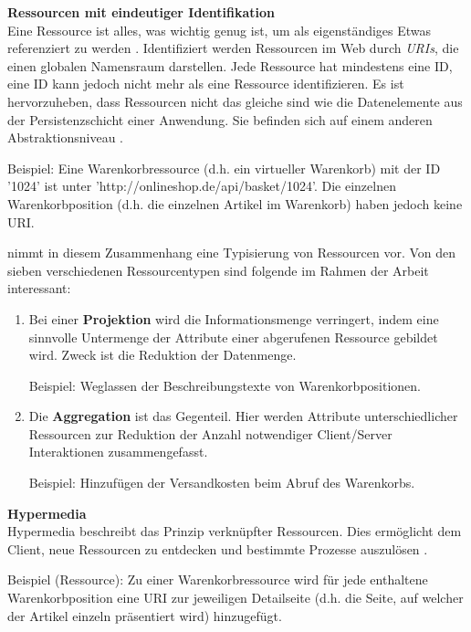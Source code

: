 \documentclass[11pt, a4paper, titlepage, listof=totoc, bibliography=totoc, index=totoc, twoside, openright, headings=normal, draft]{scrreprt}
\begin{document}
\textbf{Ressourcen mit eindeutiger Identifikation}\\
\glqq Eine Ressource ist alles, was wichtig genug ist, um als eigenständiges Etwas referenziert zu werden\grqq{} \citep{richardson07}. Identifiziert werden Ressourcen im Web durch \emph{\ac{URI}s}, die einen globalen Namensraum darstellen. Jede Ressource hat mindestens eine ID, eine ID kann jedoch nicht mehr als eine Ressource identifizieren. Es ist hervorzuheben, dass Ressourcen nicht das gleiche sind wie die Datenelemente aus der Persistenzschicht einer Anwendung. Sie befinden sich auf einem anderen Abstraktionsniveau \citep{tilkov11}.\vspace{0.3em}

Beispiel: Eine Warenkorbressource (d.h. ein virtueller Warenkorb) mit der ID '1024' ist unter 'http://onlineshop.de/api/basket/1024'. Die einzelnen Warenkorbposition (d.h. die einzelnen Artikel im Warenkorb) haben jedoch keine URI.

\citet{tilkov11} nimmt in diesem Zusammenhang eine Typisierung von Ressourcen vor. Von den sieben verschiedenen Ressourcentypen sind folgende im Rahmen der Arbeit interessant:
\begin{enumerate}
\item Bei einer \textbf{Projektion} wird die Informationsmenge verringert, indem eine sinnvolle Untermenge der Attribute einer abgerufenen Ressource gebildet wird. Zweck ist die Reduktion der Datenmenge.\vspace{0.2em}

Beispiel: Weglassen der Beschreibungstexte von Warenkorbpositionen.
\item Die \textbf{Aggregation} ist das Gegenteil. Hier werden Attribute unterschiedlicher Ressourcen zur Reduktion der Anzahl notwendiger Client/Server Interaktionen zusammengefasst.\vspace{0.2em}

Beispiel: Hinzufügen der Versandkosten beim Abruf des Warenkorbs.
\end{enumerate}
\textbf{Hypermedia}\\
Hypermedia beschreibt das Prinzip verknüpfter Ressourcen. Dies ermöglicht dem Client, neue Ressourcen zu entdecken und bestimmte Prozesse auszulösen \citep{wilde11}.

Beispiel (Ressource): Zu einer Warenkorbressource wird für jede enthaltene Warenkorbposition eine URI zur jeweiligen Detailseite (d.h. die Seite, auf welcher der Artikel einzeln präsentiert wird) hinzugefügt.
\end{document}
